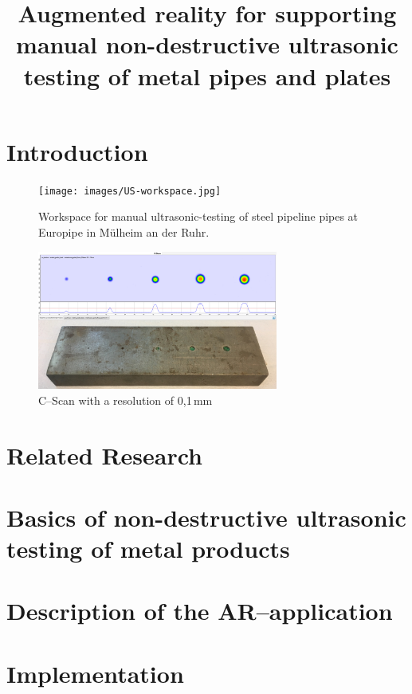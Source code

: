\documentclass{VRARWorkshop}
\title{Augmented reality for supporting manual non-destructive ultrasonic testing of metal pipes and plates}
\begin{document}
\section{Introduction}

\begin{figure}[h!]
    \begin{center}
        \texttt{[image: images/US-workspace.jpg]}
        \caption{\label{fig:europipe} Workspace for manual ultrasonic-testing of steel pipeline pipes at Europipe in Mülheim an der Ruhr.}
    \end{center}
\end{figure}

\begin{figure}[h!]
    \begin{center}
        \includegraphics[width=79mm]{images/CScan.jpg}
        \caption{\label{fig:cScan} C--Scan with a resolution of 0,1\,mm}
    \end{center}
\end{figure}

\section{Related Research}
\cite{ARPat15}
\cite{ARClean}
\cite{schwerdtfeger_using_2008}
\cite{fadzil_design_2015}
\cite{walter_non-contact_2007}

\section{Basics of non-destructive ultrasonic testing of metal products}
\cite{deutsch_zfp_2010}
\cite{moles_introduction_2004}
\cite{olympus_Grundlagen}

\section{Description of the AR--application}

\section{Implementation}
\cite{dorner_virtual_2013}
\end{document}

